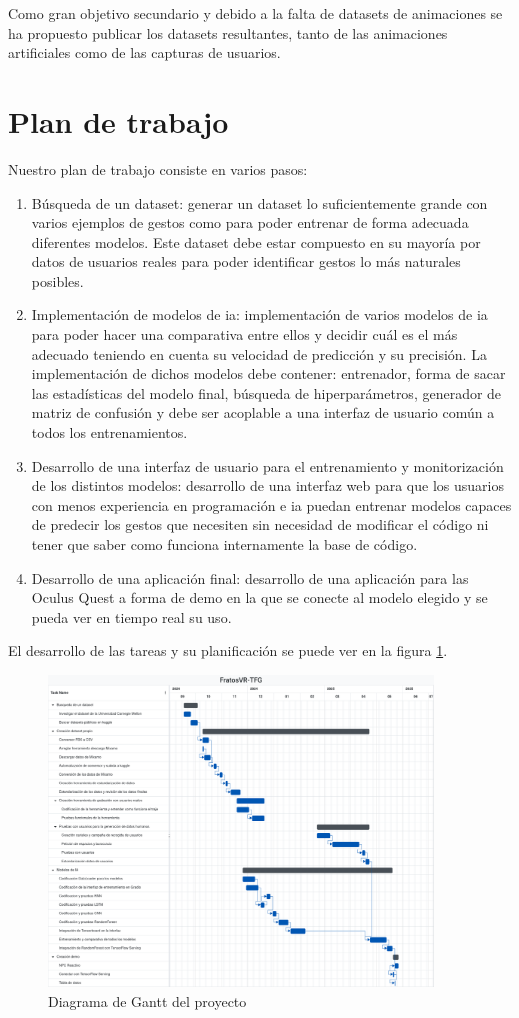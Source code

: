 Como gran objetivo secundario y debido a la falta de datasets de animaciones se ha propuesto publicar los datasets resultantes, tanto de las animaciones artificiales como de las capturas de usuarios.

\section{Plan de trabajo}
Nuestro plan de trabajo consiste en varios pasos:
\begin{enumerate}
	\item Búsqueda de un dataset: generar un dataset lo suficientemente grande con varios ejemplos de gestos como para poder entrenar de forma adecuada diferentes modelos. Este dataset debe estar compuesto en su mayoría por datos de usuarios reales para poder identificar gestos lo más naturales posibles.
	\item Implementación de modelos de \gls{ia}: implementación de varios modelos de \gls{ia} para poder hacer una comparativa entre ellos y decidir cuál es el más adecuado teniendo en cuenta su velocidad de predicción y su precisión. La implementación de dichos modelos debe contener: entrenador, forma de sacar las estadísticas del modelo final, búsqueda de hiperparámetros, generador de matriz de confusión y debe ser acoplable a una interfaz de usuario común a todos los entrenamientos.
	\item Desarrollo de una interfaz de usuario para el entrenamiento y monitorización de los distintos modelos: desarrollo de una interfaz web para que los usuarios con menos experiencia en programación e \gls{ia} puedan entrenar modelos capaces de predecir los gestos que necesiten sin necesidad de modificar el código ni tener que saber como funciona internamente la base de código.
	\item Desarrollo de una aplicación final: desarrollo de una aplicación para las Oculus Quest a forma de demo en la que se conecte al modelo elegido y se pueda ver en tiempo real su uso.
\end{enumerate}

El desarrollo de las tareas y su planificación se puede ver en la figura \ref{fig:diagrama-gantt}.

\begin{figure}[H]
	\centering
	\includegraphics[width=0.91\textwidth]{Imagenes/Vectorial/Diagrama-gannt.pdf}
	\caption{Diagrama de Gantt del proyecto}
	\label{fig:diagrama-gantt}
\end{figure}

